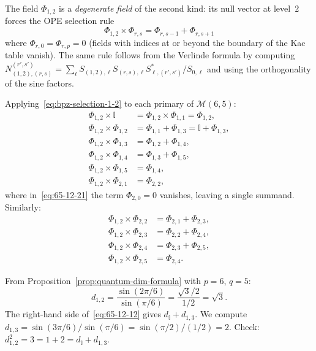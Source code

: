 \begin{computation}\label{comp:fusion-phi12-6-5}
The field $\Phi_{1,2}$ is a \emph{degenerate field} of the second kind: its
null vector at level~$2$ forces the OPE selection rule
\begin{equation}\label{eq:bpz-selection-1-2}
\Phi_{1,2} \times \Phi_{r,s} = \Phi_{r,s-1} + \Phi_{r,s+1}
\end{equation}
where $\Phi_{r,0} = \Phi_{r,p} = 0$ (fields with indices at or beyond the
boundary of the Kac table vanish).  The same rule follows from the Verlinde
formula by computing
$N_{(1,2),(r,s)}^{(r',s')} = \sum_\ell S_{(1,2),\ell}S_{(r,s),\ell}S_{\ell,(r',s')}^*/S_{0,\ell}$
and using the orthogonality of the sine factors.

Applying~\eqref{eq:bpz-selection-1-2} to each primary of $\mathcal{M}(6,5)$:
\begin{align}
\Phi_{1,2} \times \mathbb{I} &= \Phi_{1,2} \times \Phi_{1,1} = \Phi_{1,2}, \label{eq:65-12-11}\\
\Phi_{1,2} \times \Phi_{1,2} &= \Phi_{1,1} + \Phi_{1,3} = \mathbb{I} + \Phi_{1,3}, \label{eq:65-12-12}\\
\Phi_{1,2} \times \Phi_{1,3} &= \Phi_{1,2} + \Phi_{1,4}, \label{eq:65-12-13}\\
\Phi_{1,2} \times \Phi_{1,4} &= \Phi_{1,3} + \Phi_{1,5}, \label{eq:65-12-14}\\
\Phi_{1,2} \times \Phi_{1,5} &= \Phi_{1,4}, \label{eq:65-12-15}\\
\Phi_{1,2} \times \Phi_{2,1} &= \Phi_{2,2}, \label{eq:65-12-21}
\end{align}
where in~\eqref{eq:65-12-21} the term $\Phi_{2,0} = 0$ vanishes, leaving a
single summand.  Similarly:
\begin{align}
\Phi_{1,2} \times \Phi_{2,2} &= \Phi_{2,1} + \Phi_{2,3}, \label{eq:65-12-22}\\
\Phi_{1,2} \times \Phi_{2,3} &= \Phi_{2,2} + \Phi_{2,4}, \label{eq:65-12-23}\\
\Phi_{1,2} \times \Phi_{2,4} &= \Phi_{2,3} + \Phi_{2,5}, \label{eq:65-12-24}\\
\Phi_{1,2} \times \Phi_{2,5} &= \Phi_{2,4}. \label{eq:65-12-25}
\end{align}
\end{computation}

\begin{verification}[$\Phi_{1,2}\times\Phi_{1,2} = \mathbb{I} + \Phi_{1,3}$ via quantum dimensions]\label{verif:65-12-squared}
From Proposition~\ref{prop:quantum-dim-formula} with $p=6$, $q=5$:
\begin{equation}
d_{1,2}
= \frac{\sin(2\pi/6)}{\sin(\pi/6)}
= \frac{\sqrt{3}/2}{1/2} = \sqrt{3}.
\end{equation}
The right-hand side of~\eqref{eq:65-12-12} gives $d_{\mathbb{I}} + d_{1,3}$.
We compute
$d_{1,3} = \sin(3\pi/6)/\sin(\pi/6) = \sin(\pi/2)/(1/2) = 2$.
Check: $d_{1,2}^2 = 3 = 1 + 2 = d_{\mathbb{I}} + d_{1,3}$.
\end{verification}

